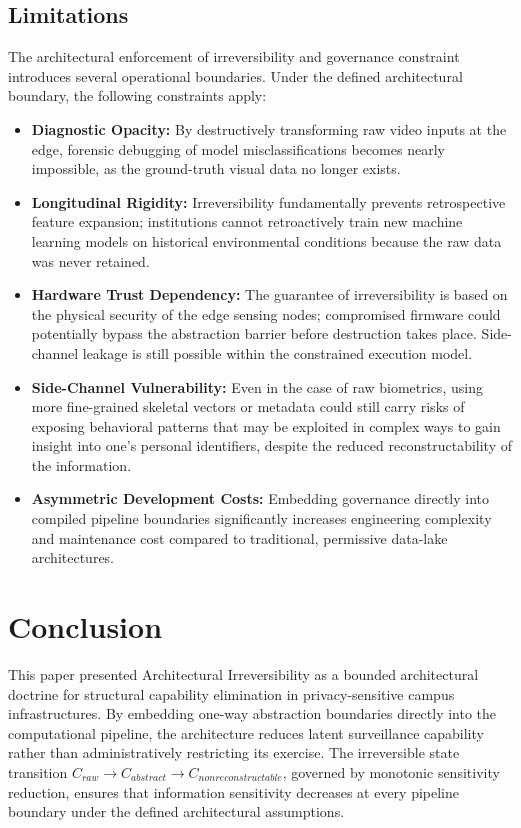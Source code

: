 \documentclass[conference]{IEEEtran}
\begin{document}
\subsection{Limitations}
The architectural enforcement of irreversibility and governance constraint introduces several operational boundaries. Under the defined architectural boundary, the following constraints apply:
\begin{itemize}
    \item \textbf{Diagnostic Opacity:} By destructively transforming raw video inputs at the edge, forensic debugging of model misclassifications becomes nearly impossible, as the ground-truth visual data no longer exists.
    \item \textbf{Longitudinal Rigidity:} Irreversibility fundamentally prevents retrospective feature expansion; institutions cannot retroactively train new machine learning models on historical environmental conditions because the raw data was never retained.
    \item \textbf{Hardware Trust Dependency:} The guarantee of irreversibility is based on the physical security of the edge sensing nodes; compromised firmware could potentially bypass the abstraction barrier before destruction takes place. Side-channel leakage is still possible within the constrained execution model.
    \item \textbf{Side-Channel Vulnerability:} Even in the case of raw biometrics, using more fine-grained skeletal vectors or metadata could still carry risks of exposing behavioral patterns that may be exploited in complex ways to gain insight into one’s personal identifiers, despite the reduced reconstructability of the information.
    \item \textbf{Asymmetric Development Costs:} Embedding governance directly into compiled pipeline boundaries significantly increases engineering complexity and maintenance cost compared to traditional, permissive data-lake architectures.
\end{itemize}

\section{Conclusion}

This paper presented Architectural Irreversibility as a bounded architectural doctrine for structural capability elimination in privacy-sensitive campus infrastructures. By embedding one-way abstraction boundaries directly into the computational pipeline, the architecture reduces latent surveillance capability rather than administratively restricting its exercise. The irreversible state transition $C_{raw} \rightarrow C_{abstract} \rightarrow C_{nonreconstructable}$, governed by monotonic sensitivity reduction, ensures that information sensitivity decreases at every pipeline boundary under the defined architectural assumptions.
\end{document}
